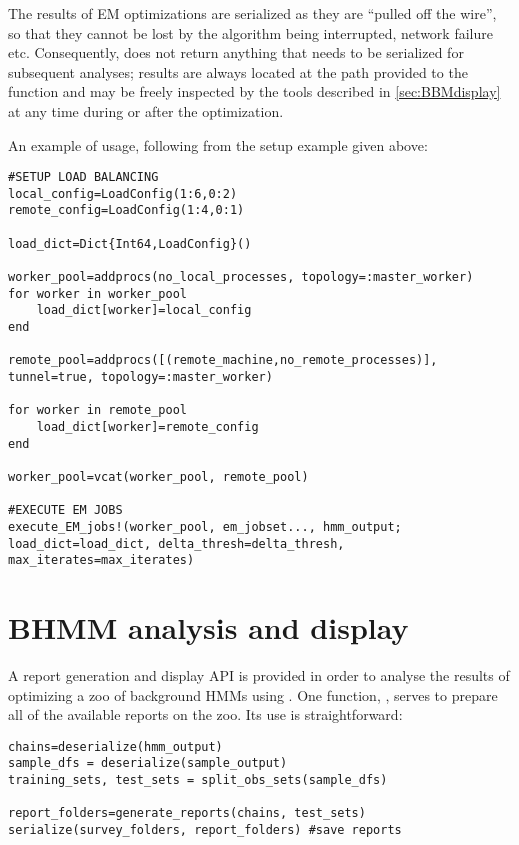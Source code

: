 The results of EM optimizations are serialized as they are ``pulled off the wire'', so that they cannot be lost by the algorithm being interrupted, network failure etc. Consequently,  does not return anything that needs to be serialized for subsequent analyses; results are always located at the path provided to the function and may be freely inspected by the tools described in \autoref{sec:BBMdisplay} at any time during or after the optimization.

An example of  usage, following from the setup example given above:

\begin{verbatim}
#SETUP LOAD BALANCING
local_config=LoadConfig(1:6,0:2)
remote_config=LoadConfig(1:4,0:1)

load_dict=Dict{Int64,LoadConfig}()

worker_pool=addprocs(no_local_processes, topology=:master_worker)
for worker in worker_pool
    load_dict[worker]=local_config
end

remote_pool=addprocs([(remote_machine,no_remote_processes)], tunnel=true, topology=:master_worker)

for worker in remote_pool
    load_dict[worker]=remote_config
end

worker_pool=vcat(worker_pool, remote_pool)

#EXECUTE EM JOBS
execute_EM_jobs!(worker_pool, em_jobset..., hmm_output; load_dict=load_dict, delta_thresh=delta_thresh, max_iterates=max_iterates)
\end{verbatim}

\section{BHMM analysis and display}
\label{sec:BBMdisplay}
A report generation and display API is provided in order to analyse the results of optimizing a zoo of background HMMs using . One function, , serves to prepare all of the available reports on the zoo. Its use is straightforward:

\begin{verbatim}
chains=deserialize(hmm_output)
sample_dfs = deserialize(sample_output)
training_sets, test_sets = split_obs_sets(sample_dfs)

report_folders=generate_reports(chains, test_sets)
serialize(survey_folders, report_folders) #save reports
\end{verbatim}


